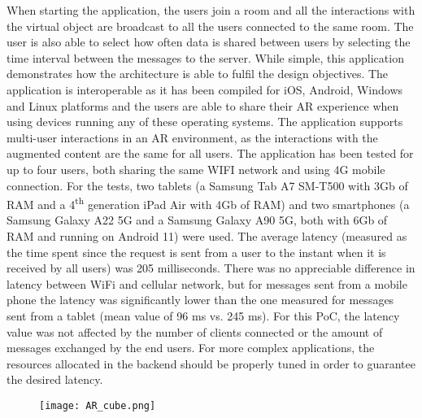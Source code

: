 When starting the application, the users join a room and all the interactions with the virtual object are broadcast to all the users connected to the same room. The user is also able to select how often data is shared between users by selecting the time interval between the messages to the server. While simple, this application demonstrates how the architecture is able to fulfil the design objectives. The application is interoperable as it has been compiled for iOS, Android, Windows and Linux platforms and the users are able to share their AR experience when using devices running any of these operating systems. The application supports multi-user interactions in an AR environment, as the interactions with the augmented content are the same for all users. The application has been tested for up to four users, both sharing the same WIFI network and using 4G mobile connection. For the tests, two tablets (a Samsung Tab A7 SM-T500 with 3Gb of RAM and a 4\textsuperscript{th} generation iPad Air with 4Gb of RAM) and two smartphones (a Samsung Galaxy A22 5G and a Samsung Galaxy A90 5G, both with 6Gb of RAM and running on Android 11) were used. The average latency (measured as the time spent since the request is sent from a user to the instant when it is received by all users) was 205 milliseconds. There was no appreciable difference in latency between WiFi and cellular network, but for messages sent from a mobile phone the latency was significantly lower than the one measured for messages sent from a tablet (mean value of 96 ms vs. 245 ms). For this PoC, the latency value was not affected by the number of clients connected or the amount of messages exchanged by the end users. For more complex applications, the resources allocated in the backend should be properly tuned in order to guarantee the desired latency.

\begin{figure}[htbp]
    \begin{center}
    \texttt{[image: AR\_cube.png]}
    \caption{\fontsize{10pt}{11pt}}
    \label{fig:arcube}
    \end{center}
\end{figure}


